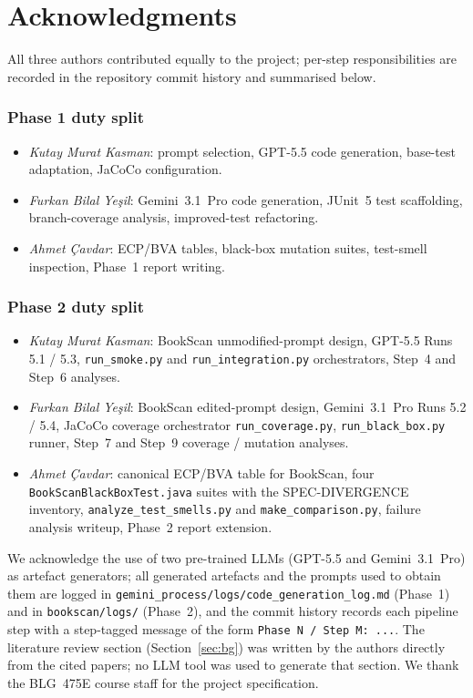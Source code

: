 \documentclass[journal]{IEEEtran}
\begin{document}
\section*{Acknowledgments}
All three authors contributed equally to the project;
per-step responsibilities are recorded in the repository
commit history and summarised below.

\subsubsection*{Phase 1 duty split}
\begin{itemize}
    \item \emph{Kutay Murat Kasman}: prompt selection, GPT-5.5
    code generation, base-test adaptation, JaCoCo configuration.
    \item \emph{Furkan Bilal Ye\c{s}il}: Gemini~3.1~Pro code
    generation, JUnit~5 test scaffolding, branch-coverage
    analysis, improved-test refactoring.
    \item \emph{Ahmet \c{C}avdar}: ECP/BVA tables, black-box
    mutation suites, test-smell inspection, Phase~1 report
    writing.
\end{itemize}

\subsubsection*{Phase 2 duty split}
\begin{itemize}
    \item \emph{Kutay Murat Kasman}: BookScan unmodified-prompt
    design, GPT-5.5 Runs 5.1 / 5.3, \texttt{run\_smoke.py} and
    \texttt{run\_integration.py} orchestrators, Step~4 and
    Step~6 analyses.
    \item \emph{Furkan Bilal Ye\c{s}il}: BookScan edited-prompt
    design, Gemini~3.1~Pro Runs 5.2 / 5.4, JaCoCo coverage
    orchestrator \texttt{run\_coverage.py},
    \texttt{run\_black\_box.py} runner, Step~7 and Step~9
    coverage / mutation analyses.
    \item \emph{Ahmet \c{C}avdar}: canonical ECP/BVA table for
    BookScan, four \texttt{BookScanBlackBoxTest.java} suites
    with the SPEC-DIVERGENCE inventory,
    \texttt{analyze\_test\_smells.py} and \texttt{make\_comparison.py},
    failure analysis writeup, Phase~2 report extension.
\end{itemize}

We acknowledge the use of two pre-trained LLMs (GPT-5.5 and
Gemini~3.1~Pro) as artefact generators; all generated
artefacts and the prompts used to obtain them are logged in
\texttt{gemini\_process/logs/code\_generation\_log.md} (Phase~1)
and in \texttt{bookscan/logs/} (Phase~2), and the commit
history records each pipeline step with a step-tagged message
of the form \texttt{Phase~N / Step~M: ...}. The literature
review section (Section~\ref{sec:bg}) was written by the
authors directly from the cited papers; no LLM tool was used
to generate that section. We thank the BLG~475E course staff
for the project specification.



\end{document}

